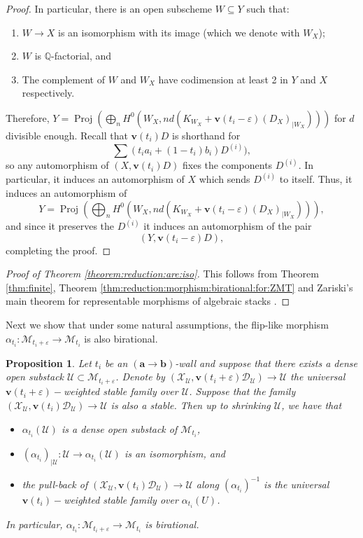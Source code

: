 \documentclass[11pt]{amsart}
\newtheorem{prop}[theorem]{Proposition}
\theoremstyle{definition}
\theoremstyle{remark}
\newcommand{\calU}{\mathcal U}
\newcommand{\calX}{\mathcal X}
\newcommand{\calD}{\mathcal D}
\newcommand{\sM}{\mathscr{M}}
\newcommand{\Proj}{\operatorname{Proj}}
\newcommand{\bfa}{\mathbf{a}}
\newcommand{\bfv}{\mathbf{v}}
\newcommand{\bfb}{\mathbf{b}}
\begin{document}
\begin{proof}
		In particular, there is an open subscheme $W \subseteq Y$ such that:
		\begin{enumerate}
			\item $W \to X$ is an isomorphism with its image (which we denote with $W_X$);
			\item $W$ is $\mathbb{Q}$-factorial, and
			\item The complement of $W$ and $W_X$ have codimension at least 2 in $Y$ and $X$ respectively.
		\end{enumerate}
		Therefore, $Y=\Proj(\bigoplus_n H^0(W_X,nd(K_{W_X}+\mathbf{v}(t_i-\varepsilon)(D_X)_{|W_X})))$ for $d$ divisible enough. Recall that $\mathbf{v}(t_i)D$ is shorthand for 
		$$
		\sum (t_ia_i+(1-t_i)b_i)D^{(i)}),
		$$
		so any automorphism of $(X,\mathbf{v}(t_i)D)$ fixes the components $D^{(i)}$. In particular, it induces an automorphism of $X$ which sends $D^{(i)}$ to itself. Thus, it induces an automorphism of 
		$$
		Y=\Proj(\bigoplus_n H^0(W_X,nd(K_{W_X}+\mathbf{v}(t_i-\varepsilon)(D_X)_{|W_X}))),
		$$ and since it preserves the $D^{(i)}$ it induces an automorphism of the pair $$(Y,\mathbf{v}(t_i-\varepsilon)D),$$ completing the proof.
	\end{proof}
	\begin{proof}[Proof of Theorem \ref{theorem:reduction:are:iso}] This follows from Theorem \ref{thm:finite}, Theorem \ref{thm:reduction:morphism:birational:for:ZMT} and Zariski's main theorem for representable morphisms of algebraic stacks \cite[Theorem 16.5]{LMB00}. \end{proof}
	
	Next we show that under some natural assumptions, the flip-like morphism $\alpha_{t_i} : \sM_{t_i + \varepsilon} \to \sM_{t_i}$ is also birational.  
	
	\begin{prop}\label{prop_answer_Zsolt_question} Let $t_i$ be an $(\bfa \to \bfb)$-wall and suppose that there exists a dense open substack $\calU \subset \sM_{t_i+\varepsilon}$. Denote by $(\calX_\calU,\bfv(t_i + \varepsilon)\calD_\calU)\to \calU$ the universal $\bfv(t_i+\varepsilon)-$weighted stable family over $\calU$. Suppose that the family $(\calX_\calU,\bfv(t_i)\calD_{\calU})\to \calU$ is also a stable. Then up to shrinking $\calU$, we have that
		\begin{itemize}
			\item $\alpha_{t_i}(\calU)$ is a dense open substack of $\sM_{t_i}$,
			\item $(\alpha_{t_i})_{|\calU}:\calU \to \alpha_{t_i}(\calU)$ is an isomorphism, and
			\item the pull-back of $(\calX_\calU, \bfv(t_i)\calD_\calU) \to \calU$ along $(\alpha_{t_i})^{-1}$ is the universal $\bfv(t_i)-$weighted stable family over $\alpha_{t_i}(U)$. 
		\end{itemize} In particular, $\alpha_{t_i} : \sM_{t_i+\varepsilon} \to \sM_{t_i}$ is birational.
	\end{prop}
	
\end{document}
